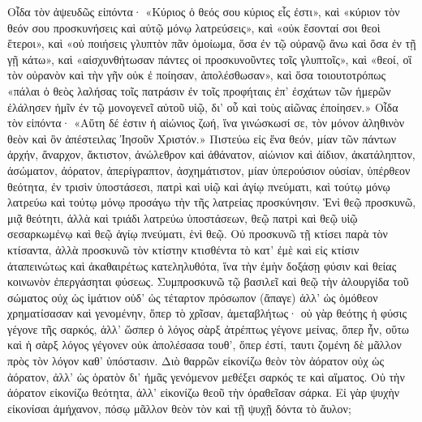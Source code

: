 \documentclass[10pt]{book}
\newcommand{\switchgreek}[1][]{\selectlanguage{polutonikogreek} \switchcolumn*[#1]}
\newcommand{\switchenglish}{\selectlanguage{english} \switchcolumn}
\begin{document}
\begin{paracol}{2}
\switchgreek

Οἶδα τὸν ἀψευδῶς εἰπόντα· «Κύριος ὁ θεός σου κύριος εἷς ἐστι», καὶ «κύριον τὸν θεόν σου προσκυνήσεις καὶ αὐτῷ μόνῳ λατρεύσεις», καὶ «οὐκ ἔσονταί σοι θεοὶ ἕτεροι», καὶ «οὐ ποιήσεις γλυπτὸν πᾶν ὁμοίωμα, ὅσα ἐν τῷ οὐρανῷ ἄνω καὶ ὅσα ἐν τῇ γῇ κάτω», καὶ «αἰσχυνθήτωσαν πάντες οἱ προσκυνοῦντες τοῖς γλυπτοῖς», καὶ «θεοί, οἳ τὸν οὐρανὸν καὶ τὴν γῆν οὐκ ἐ ποίησαν, ἀπολέσθωσαν», καὶ ὅσα τοιουτοτρόπως «πάλαι ὁ θεὸς λαλήσας τοῖς πατράσιν ἐν τοῖς προφήταις ἐπ' ἐσχάτων τῶν ἡμερῶν ἐλάλησεν ἡμῖν ἐν τῷ μονογενεῖ αὐτοῦ υἱῷ, δι' οὗ καὶ τοὺς αἰῶνας ἐποίησεν.»
Οἶδα τὸν εἰπόντα· «Αὕτη δέ ἐστιν ἡ αἰώνιος ζωή, ἵνα γινώσκωσί σε, τὸν μόνον ἀληθινὸν θεὸν καὶ ὃν ἀπέστειλας Ἰησοῦν Χριστόν.»
Πιστεύω εἰς ἕνα θεόν, μίαν τῶν πάντων ἀρχήν, ἄναρχον, ἄκτιστον, ἀνώλεθρον καὶ ἀθάνατον, αἰώνιον καὶ ἀίδιον, ἀκατάληπτον, ἀσώματον, ἀόρατον, ἀπερίγραπτον, ἀσχημάτιστον, μίαν ὑπερούσιον οὐσίαν, ὑπέρθεον θεότητα, ἐν τρισὶν ὑποστάσεσι, πατρὶ καὶ υἱῷ καὶ ἁγίῳ πνεύματι, καὶ τούτῳ μόνῳ λατρεύω καὶ τούτῳ μόνῳ προσάγω τὴν τῆς λατρείας προσκύνησιν.
Ἑνὶ θεῷ προσκυνῶ, μιᾷ θεότητι, ἀλλὰ καὶ τριάδι λατρεύω ὑποστάσεων, θεῷ πατρὶ καὶ θεῷ υἱῷ σεσαρκωμένῳ καὶ θεῷ ἁγίῳ πνεύματι, ἑνὶ θεῷ.
Οὐ προσκυνῶ τῇ κτίσει παρὰ τὸν κτίσαντα, ἀλλὰ προσκυνῶ τὸν κτίστην κτισθέντα τὸ κατ' ἐμὲ καὶ εἰς κτίσιν ἀταπεινώτως καὶ ἀκαθαιρέτως κατεληλυθότα, ἵνα τὴν ἐμὴν δοξάσῃ φύσιν καὶ θείας κοινωνὸν ἐπεργάσηται φύσεως.
Συμπροσκυνῶ τῷ βασιλεῖ καὶ θεῷ τὴν ἁλουργίδα τοῦ σώματος οὐχ ὡς ἱμάτιον οὐδ' ὡς τέταρτον πρόσωπον (ἄπαγε) ἀλλ' ὡς ὁμόθεον χρηματίσασαν καὶ γενομένην, ὅπερ τὸ χρῖσαν, ἀμεταβλήτως· οὐ γὰρ θεότης ἡ φύσις γέγονε τῆς σαρκός, ἀλλ' ὥσπερ ὁ λόγος σὰρξ ἀτρέπτως γέγονε μείνας, ὅπερ ἦν, οὕτω καὶ ἡ σὰρξ λόγος γέγονεν οὐκ ἀπολέσασα τουθ', ὅπερ ἐστί, ταυτι ζομένη δὲ μᾶλλον πρὸς τὸν λόγον καθ' ὑπόστασιν.
Διὸ θαρρῶν εἰκονίζω θεὸν τὸν ἀόρατον οὐχ ὡς ἀόρατον, ἀλλ' ὡς ὁρατὸν δι' ἡμᾶς γενόμενον μεθέξει σαρκός τε καὶ αἵματος.
Οὐ τὴν ἀόρατον εἰκονίζω θεότητα, ἀλλ' εἰκονίζω θεοῦ τὴν ὁραθεῖσαν σάρκα. Εἰ γὰρ ψυχὴν εἰκονίσαι ἀμήχανον, πόσῳ μᾶλλον θεὸν τὸν καὶ τῇ ψυχῇ δόντα τὸ ἄυλον;

\switchenglish


\end{paracol}
\end{document}
